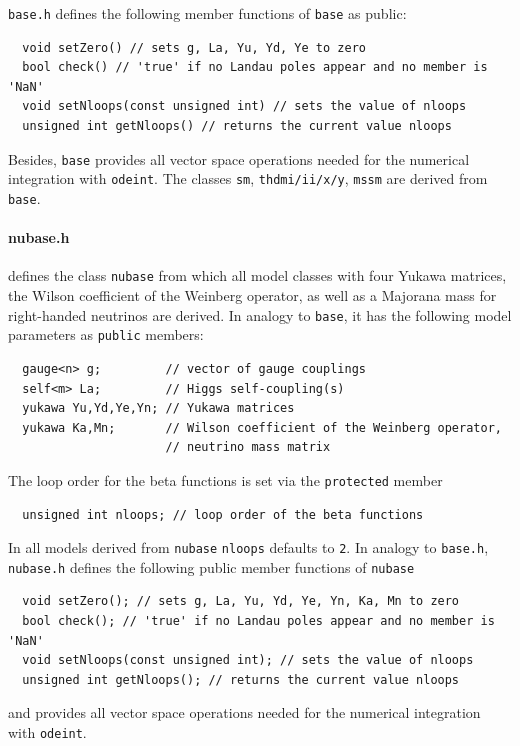 \documentclass[preprint,12pt]{elsarticle}
\begin{document}
\texttt{base.h} defines the following member functions of \texttt{base} as public:
\begin{lstlisting}
  void setZero() // sets g, La, Yu, Yd, Ye to zero
  bool check() // 'true' if no Landau poles appear and no member is 'NaN'
  void setNloops(const unsigned int) // sets the value of nloops
  unsigned int getNloops() // returns the current value nloops
\end{lstlisting}
Besides, \texttt{base} provides all vector space operations needed for the numerical integration with \texttt{odeint}. The classes \texttt{sm}, \texttt{thdmi/ii/x/y}, \texttt{mssm} are derived from \texttt{base}.

\paragraph{nubase.h}
defines the class \texttt{nubase} from which all model classes with four Yukawa matrices, the Wilson coefficient of the Weinberg operator, as well as a Majorana mass for right-handed neutrinos are derived.
In analogy to \texttt{base}, it has the following model parameters as \texttt{public} members:
\begin{lstlisting}
  gauge<n> g;         // vector of gauge couplings
  self<m> La;         // Higgs self-coupling(s)
  yukawa Yu,Yd,Ye,Yn; // Yukawa matrices
  yukawa Ka,Mn;       // Wilson coefficient of the Weinberg operator,
                      // neutrino mass matrix   
\end{lstlisting}
The loop order for the beta functions is set via the \texttt{protected} member
\begin{lstlisting}
  unsigned int nloops; // loop order of the beta functions
\end{lstlisting}
In all models derived from \texttt{nubase} \texttt{nloops} defaults to \texttt{2}.
In analogy to \texttt{base.h}, \texttt{nubase.h} defines the following public member functions of \texttt{nubase}
\begin{lstlisting}
  void setZero(); // sets g, La, Yu, Yd, Ye, Yn, Ka, Mn to zero
  bool check(); // 'true' if no Landau poles appear and no member is 'NaN'
  void setNloops(const unsigned int); // sets the value of nloops
  unsigned int getNloops(); // returns the current value nloops
\end{lstlisting}
and provides all vector space operations needed for the numerical integration with \texttt{odeint}.
\end{document}
